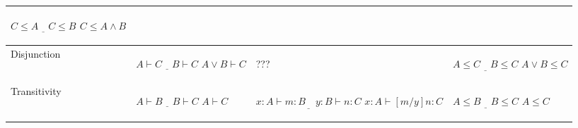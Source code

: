 \begin{tabular}{| p{2cm} | p{3cm} | p{4.5cm} | p{3cm} |}
\begin{center}
    $\underline{C \leq A \quad C \leq B}$\newline
    $C \leq A \wedge B$
    \end{center} \\ \hline
Disjunction
  & \begin{center}
    $\underline{A \vdash C \quad B \vdash C}$\newline
    $A \vee B \vdash C$
    \end{center}
  & \begin{center}
    ???
    \end{center}
  & \begin{center}
    $\underline{A \leq C \quad B \leq C}$\newline
    $A \vee B \leq C$
    \end{center} \\ \hline
Transitivity
  & \begin{center}
      $\underline{A \vdash B \quad B \vdash C}$\newline
      $A \vdash C$
    \end{center}
  & \begin{center}
    $\underline{x:A \vdash m:B \quad y:B \vdash n:C}$\newline
    $x:A \vdash [m/y]n:C$
    \end{center}
  & \begin{center}
    $\underline{A \leq B \quad B \leq C}$\newline
    $A \leq C$
    \end{center} \\ \hline
\hline
\end{tabular}
\\
